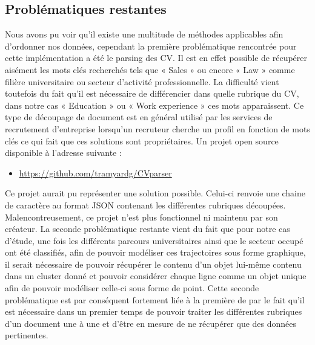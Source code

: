 \documentclass[memoire.tex]{subfiles}
\begin{document}
\subsection{Problématiques restantes}
Nous avons pu voir qu’il existe une multitude de méthodes applicables afin d’ordonner nos données, cependant la première problématique rencontrée pour cette implémentation a été le parsing des CV. Il est en effet possible de récupérer aisément les mots clés recherchés tels que « Sales » ou encore « Law » comme filière universitaire ou secteur d’activité professionnelle. La difficulté vient toutefois du fait qu’il est nécessaire de différencier dans quelle rubrique du CV, dans notre cas « Education » ou « Work experience » ces mots apparaissent. Ce type de découpage de document est en général utilisé par les services de recrutement d’entreprise lorsqu’un recruteur cherche un profil en fonction de mots clés ce qui fait que ces solutions sont propriétaires. Un projet open source disponible à l’adresse suivante :
\begin{itemize}
\item \url{https://github.com/tramyardg/CVparser}
\end{itemize}

Ce projet aurait pu représenter une solution possible. Celui-ci renvoie une chaine de caractère au format JSON contenant les différentes rubriques découpées. Malencontreusement, ce projet n’est plus fonctionnel ni maintenu par son créateur.
La seconde problématique restante vient du fait que pour notre cas d’étude, une fois les différents parcours universitaires ainsi que le secteur occupé ont été classifiés, afin de pouvoir modéliser ces trajectoires sous forme graphique, il serait nécessaire de pouvoir récupérer le contenu d’un objet lui-même contenu dans un cluster donné et pouvoir considérer chaque ligne comme un objet unique afin de pouvoir modéliser celle-ci sous forme de point. Cette seconde problématique est par conséquent fortement liée à la première de par le fait qu’il est nécessaire dans un premier temps de pouvoir traiter les différentes rubriques d’un document une à une et d’être en mesure de ne récupérer que des données pertinentes.
\end{document}

